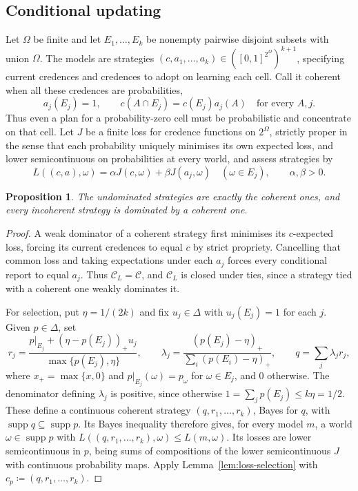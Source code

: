 \documentclass[11pt]{article}
\newtheorem{proposition}[theorem]{Proposition}
\theoremstyle{definition}
\theoremstyle{remark}
\newcommand{\C}{\mathcal C}
\newcommand{\supp}{\operatorname{supp}}
\begin{document}
\subsection{Conditional updating}
Let $\Omega$ be finite and let $E_1,\ldots,E_k$ be nonempty pairwise disjoint subsets with union $\Omega$. The models are strategies $(c,a_1,\ldots,a_k)\in([0,1]^{2^\Omega})^{k+1}$, specifying current credences and credences to adopt on learning each cell. Call it coherent when all these credences are probabilities,
\[
a_j(E_j)=1,\qquad c(A\cap E_j)=c(E_j)a_j(A)\quad\text{for every }A,j.
\]
Thus even a plan for a probability-zero cell must be probabilistic and concentrate on that cell. Let $J$ be a finite loss for credence functions on $2^\Omega$, strictly proper in the sense that each probability uniquely minimises its own expected loss, and lower semicontinuous on probabilities at every world, and assess strategies by
\[
L((c,a),\omega)=\alpha J(c,\omega)+\beta J(a_j,\omega)
\quad(\omega\in E_j),\qquad \alpha,\beta>0.
\]
\begin{proposition}\label{prop:short-updating}
The undominated strategies are exactly the coherent ones, and every incoherent strategy is dominated by a coherent one.
\end{proposition}
\begin{proof}
A weak dominator of a coherent strategy first minimises its $c$-expected loss, forcing its current credences to equal $c$ by strict propriety. Cancelling that common loss and taking expectations under each $a_j$ forces every conditional report to equal $a_j$. {\color{red}Thus $\C_L=\C$, and $\C_L$ is closed under ties, since a strategy tied with a coherent one weakly dominates it.}

For selection, put $\eta=1/(2k)$ and fix $u_j\in\Delta$ with $u_j(E_j)=1$ for each $j$. Given $p\in\Delta$, set
\[
r_j=\frac{p|_{E_j}+(\eta-p(E_j))_+u_j}{\max\{p(E_j),\eta\}},\qquad
\lambda_j=\frac{(p(E_j)-\eta)_+}{\sum_i(p(E_i)-\eta)_+},\qquad
q=\sum_j\lambda_jr_j,
\]
where $x_+=\max\{x,0\}$ and $p|_{E_j}(\omega)=p_\omega$ for $\omega\in E_j$, and $0$ otherwise. The denominator defining $\lambda_j$ is positive, since otherwise $1=\sum_jp(E_j)\le k\eta=1/2$. These define a continuous coherent strategy $(q,r_1,\ldots,r_k)$, Bayes for $q$, with $\supp q\subseteq\supp p$. Its Bayes inequality therefore gives, for every model $m$, a world $\omega\in\supp p$ with $L((q,r_1,\ldots,r_k),\omega)\le L(m,\omega)$. Its losses are lower semicontinuous in $p$, being sums of compositions of the lower semicontinuous $J$ with continuous probability maps. {\color{red}Apply Lemma~\ref{lem:loss-selection} with $c_p\coloneqq(q,r_1,\ldots,r_k)$.}
\end{proof}
\end{document}
